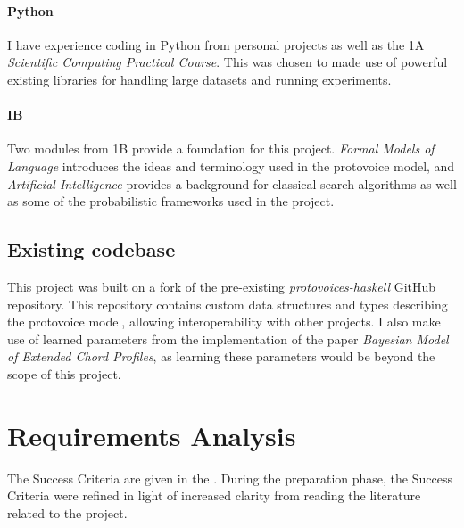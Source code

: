 \documentclass[12pt,a4paper,twoside,openright]{report}
\theoremstyle{definition}
\begin{document}
\paragraph{Python}{I have experience coding in Python from personal projects as well as the 1A \textit{Scientific Computing Practical Course}. This was chosen to made use of powerful existing libraries for handling large datasets and running experiments. }

\paragraph{IB}{ Two modules from 1B provide a foundation for this project. \textit{Formal Models of Language} introduces the ideas and terminology used in the protovoice model, and \textit{Artificial Intelligence} provides a background for classical search algorithms as well as some of the probabilistic frameworks used in the project.}

\subsection{Existing codebase}
This project was built on a fork of the pre-existing \textit{protovoices-haskell} GitHub repository. This repository contains custom data structures and types describing the protovoice model, allowing interoperability with other projects. I also make use of learned parameters from the implementation of the paper \textit{Bayesian Model of Extended Chord Profiles}\cite{finkensiepChordTypesOrnamentation2023}, as learning these parameters would be beyond the scope of this project. 

\section{Requirements Analysis}
The Success Criteria are given in the . During the preparation phase, the Success Criteria were refined in light of increased clarity from reading the literature related to the project. 
\end{document}
